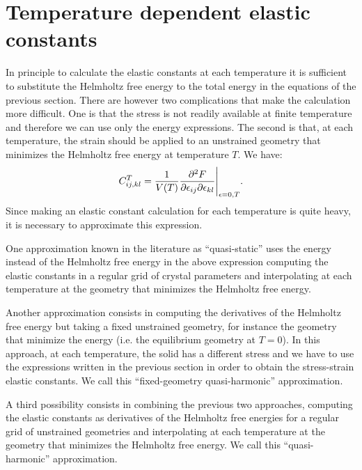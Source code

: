\documentclass[12pt,a4paper]{article}
\begin{document}
\newpage
\section{\color{coral}Temperature dependent elastic constants}
In principle to calculate the elastic constants at each temperature it
is sufficient to substitute the Helmholtz free energy to the total energy
in the equations of the previous section. 
There are however two complications
that make the calculation more difficult. One is that the stress is not
readily available at finite temperature and therefore we can use only the
energy expressions. The second is that, at each temperature, the strain should
be applied to an unstrained geometry that minimizes the Helmholtz free energy 
at temperature $T$. 
We have:
\begin{equation}
C_{ij,kl}^T= {1 \over V(T)}{\partial^2 F \over \partial \epsilon_{ij} 
\partial \epsilon_{kl}}\Bigg|_{\epsilon=0,T}.
\end{equation}
Since making an elastic constant calculation for each temperature is
quite heavy, it is necessary to approximate this expression.

One approximation known in the literature as ``quasi-static'' 
uses the energy instead of the Helmholtz free energy 
in the above expression computing the elastic constants in a regular grid of
crystal parameters and interpolating at each temperature at the geometry
that minimizes the Helmholtz free energy.

Another approximation consists in computing the derivatives of the
Helmholtz free energy but taking a fixed unstrained geometry, for instance 
the geometry that minimize the energy (i.e. the equilibrium geometry 
at $T=0$). In this approach, at each temperature, the solid has a different 
stress and we have to use the expressions written in the previous section 
in order to obtain the stress-strain elastic constants. We call 
this ``fixed-geometry quasi-harmonic'' approximation.

A third possibility consists in combining the previous two approaches,
computing the elastic constants as derivatives of the Helmholtz free
energies for a regular grid of unstrained geometries and interpolating at 
each temperature at the geometry that minimizes the Helmholtz free energy.
We call this ``quasi-harmonic'' approximation.
\end{document}
